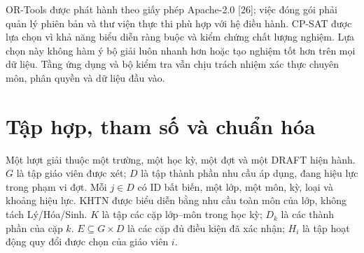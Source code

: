 \documentclass[12pt,a4paper]{report}
\begin{document}
OR-Tools được phát hành theo giấy phép Apache-2.0 [26]; việc đóng gói phải quản lý phiên bản và thư viện thực thi phù hợp với hệ điều hành. CP-SAT được lựa chọn vì khả năng biểu diễn ràng buộc và kiểm chứng chất lượng nghiệm. Lựa chọn này không hàm ý bộ giải luôn nhanh hơn hoặc tạo nghiệm tốt hơn trên mọi dữ liệu. Tầng ứng dụng và bộ kiểm tra vẫn chịu trách nhiệm xác thực chuyên môn, phân quyền và dữ liệu đầu vào.

\section{Tập hợp, tham số và chuẩn hóa}\label{sec:solver-input}
Một lượt giải thuộc một trường, một học kỳ, một đợt và một DRAFT hiện hành.
$G$ là tập giáo viên được xét; $D$ là tập thành phần nhu cầu áp dụng, đang
hiệu lực trong phạm vi đợt. Mỗi $j\in D$ có ID bất biến, một lớp, một môn, kỳ, loại và khoảng hiệu lực. KHTN được biểu diễn bằng nhu cầu toàn môn của lớp, không tách Lý/Hóa/Sinh.
$K$ là tập các cặp lớp--môn trong học kỳ; $D_k$ là các thành phần của cặp $k$.
$E\subseteq G\times D$ là các cặp đủ điều kiện đã xác nhận; $H_i$ là tập
hoạt động quy đổi được chọn của giáo viên $i$.
\end{document}
